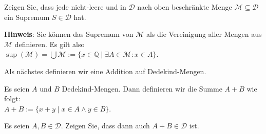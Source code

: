 \exercise
Zeigen Sie, dass jede nicht-leere und in $\mathcal{D}$ nach oben beschränkte Menge
$\mathcal{M} \subseteq \mathcal{D}$ ein Supremum $S \in \mathcal{D}$ hat.  
\vspace*{0.2cm}

\noindent
\textbf{Hinweis}: Sie können das Supremum von $\mathcal{M}$ als die Vereinigung aller Mengen aus
$\mathcal{M}$ definieren.  Es gilt also
\\[0.2cm]
\hspace*{1.3cm}
$\sup(\mathcal{M}) = \bigcup \mathcal{M} := \{ x \in \mathbb{Q} \mid \exists A \in \mathcal{M}: x \in A \}$.
\eox
\vspace*{0.2cm}

\noindent
Als nächstes definieren wir eine Addition auf Dedekind-Mengen.


\begin{Definition} \hspace*{\fill} \linebreak
Es seien $A$ und $B$ Dedekind-Mengen.  Dann definieren wir die Summe $A + B$ wie folgt:
\\[0.2cm]
\hspace*{1.3cm}
$A + B := \{ x + y \mid x \in A \wedge y \in B \}$. \edx
\end{Definition}

\exercise
Es seien $A,B \in \mathcal{D}$.  Zeigen Sie, dass dann auch $A + B \in \mathcal{D}$ ist.
\eox

